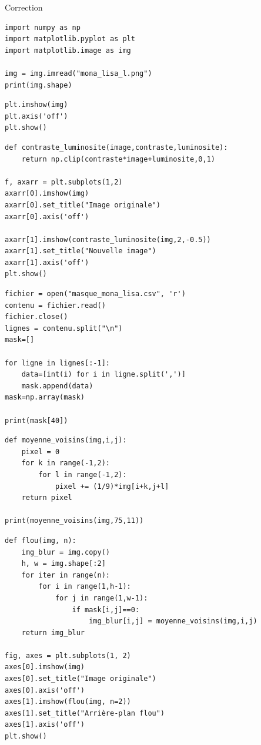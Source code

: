 \begin{center}
\Large{Correction}
\end{center}

\reponse{}

\begin{verbatim}
import numpy as np
import matplotlib.pyplot as plt
import matplotlib.image as img

img = img.imread("mona_lisa_l.png")
print(img.shape)
\end{verbatim}

\reponse{}

\begin{verbatim}
plt.imshow(img)
plt.axis('off')
plt.show()
\end{verbatim}

\reponse{}

\begin{verbatim}
def contraste_luminosite(image,contraste,luminosite):
    return np.clip(contraste*image+luminosite,0,1)

f, axarr = plt.subplots(1,2)
axarr[0].imshow(img)
axarr[0].set_title("Image originale")
axarr[0].axis('off')

axarr[1].imshow(contraste_luminosite(img,2,-0.5))
axarr[1].set_title("Nouvelle image")
axarr[1].axis('off')
plt.show()
\end{verbatim}

\reponse{}

\begin{verbatim}
fichier = open("masque_mona_lisa.csv", 'r')
contenu = fichier.read()
fichier.close()
lignes = contenu.split("\n")
mask=[]

for ligne in lignes[:-1]:
    data=[int(i) for i in ligne.split(',')]
    mask.append(data)
mask=np.array(mask)

print(mask[40])
\end{verbatim}

\reponse{}

\begin{verbatim}
def moyenne_voisins(img,i,j):
    pixel = 0
    for k in range(-1,2):
        for l in range(-1,2):
            pixel += (1/9)*img[i+k,j+l]
    return pixel

print(moyenne_voisins(img,75,11))
\end{verbatim}

\reponse{}

\begin{verbatim}
def flou(img, n):
    img_blur = img.copy()
    h, w = img.shape[:2]
    for iter in range(n):
        for i in range(1,h-1):
            for j in range(1,w-1):
                if mask[i,j]==0:
                    img_blur[i,j] = moyenne_voisins(img,i,j)
    return img_blur

fig, axes = plt.subplots(1, 2)
axes[0].imshow(img)
axes[0].set_title("Image originale")
axes[0].axis('off')
axes[1].imshow(flou(img, n=2))
axes[1].set_title("Arrière-plan flou")
axes[1].axis('off')
plt.show()
\end{verbatim}

